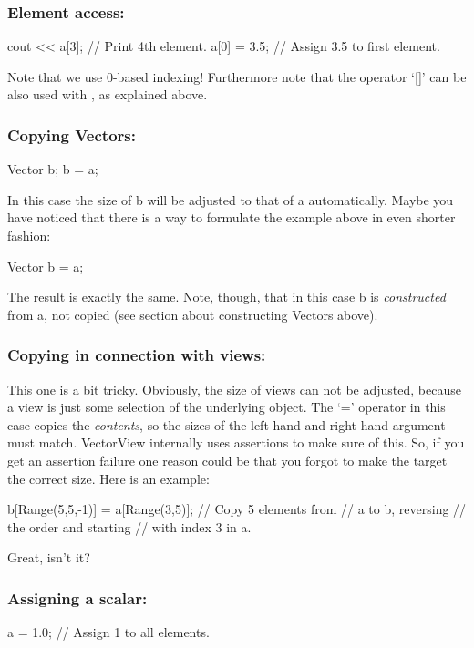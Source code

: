 \subsubsection{Element access:}
\begin{code}
cout << a[3];   // Print 4th element.
a[0] = 3.5;     // Assign 3.5 to first element.
\end{code}

Note that we use 0-based indexing! Furthermore note that the operator
`[]' can be also used with , as explained above.

\subsubsection{Copying Vectors:}
\begin{code}
Vector b;
b = a;
\end{code}
In this case the size of b will be adjusted to that of a
automatically. Maybe you have noticed that there is a way to formulate the 
example above in even shorter fashion:
\begin{code}
Vector b = a;
\end{code}
The result is exactly the same. Note, though, that in this case b is
\emph{constructed} from a, not copied (see section about constructing
Vectors above). 

\subsubsection{Copying in connection with views:}
This one is a bit tricky. Obviously, the size of views can not be
adjusted, because a view is just some selection of the underlying
object. The `=' operator in this case copies the
\emph{contents}, so the sizes of the left-hand and right-hand argument
must match. VectorView internally uses assertions to make sure of
this. So, if you get an assertion failure one reason could be that you
forgot to make the target the correct size. Here is an example:
\begin{code}
b[Range(5,5,-1)] = a[Range(3,5)];  // Copy 5 elements from 
                                   // a to b, reversing 
                                   // the order and starting
                                   // with index 3 in a.
\end{code}
Great, isn't it?

\subsubsection{Assigning a scalar:}
\begin{code}
a = 1.0;                        // Assign 1 to all elements.
\end{code}


